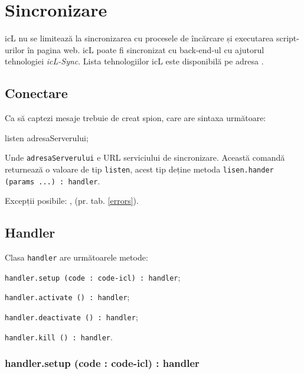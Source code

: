 \section{Sincronizare}
\label{sync}

icL nu se limitează la sincronizarea cu procesele de încărcare și executarea script-urilor în pagina web. icL poate fi sincronizat cu back-end-ul cu ajutorul tehnologiei \textit{icL-Sync}. Lista tehnologiilor icL este disponibilă pe adresa .

\subsection{Conectare}

Ca să captezi mesaje trebuie de creat spion, care are sintaxa următoare:
\begin{iclcode}
listen adresaServerului;
\end{iclcode}

Unde \texttt{adresaServerului} e URL serviciului de sincronizare. Această comandă returnează o valoare de tip \texttt{listen}, acest tip deține metoda \texttt{lisen.hander (params ...) : handler}.

Excepții posibile: ,  (pr. tab. \ref{errors}).

\subsection{Handler}

Clasa \texttt{handler} are următoarele metode:
\begin{icItems}
\item \texttt{handler.setup (code : code-icl) : handler};
\item \texttt{handler.activate () : handler};
\item \texttt{handler.deactivate () : handler};
\item \texttt{handler.kill () : handler}.
\end{icItems}

\subsubsection{handler.setup (code : code-icl) : handler}

